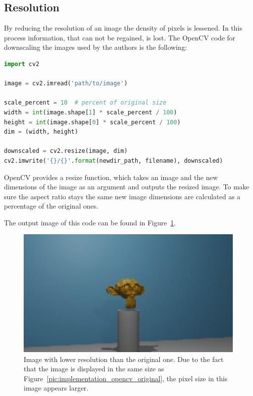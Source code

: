 \subsection{Resolution}
By reducing the resolution of an image the density of pixels is lessened. In this process information, that can not be regained, is lost. The OpenCV code for downscaling the images used by the authors is the following:

\begin{lstlisting}[language=python]
import cv2

image = cv2.imread('path/to/image')

scale_percent = 10  # percent of original size
width = int(image.shape[1] * scale_percent / 100)
height = int(image.shape[0] * scale_percent / 100)
dim = (width, height)

downscaled = cv2.resize(image, dim)
cv2.imwrite('{}/{}'.format(newdir_path, filename), downscaled)
\end{lstlisting}

OpenCV provides a resize function, which takes an image and the new dimensions of the image as an argument and outputs the resized image. To make sure the aspect ratio stays the same new image dimensions are calculated as a percentage of the original ones.

The output image of this code can be found in Figure~\ref{pic:implementation_opencv_resolution}.

\begin{figure}[h!]
	\centering
	\includegraphics[width=4.5in]{img/implementation_opencv_resolution.jpg}
	\caption{Image with lower resolution than the original one. Due to the fact that the image is displayed in the same size as Figure~\ref{pic:implementation_opencv_original}, the pixel size in this image appears larger.}
	\label{pic:implementation_opencv_resolution}
\end{figure}

